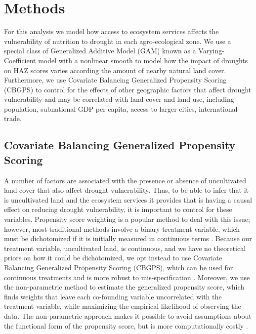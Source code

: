 \documentclass{article}
\begin{document}
\section{Methods}
For this analysis we model how access to ecosystem services affects the vulnerability of nutrition to drought in each agro-ecological zone.  We use a special class of Generalized Additive Model (GAM) known as a Varying-Coefficient model \cite{Wood2017} with a nonlinear smooth to model how the impact of droughts on HAZ scores varies according the amount of nearby natural land cover.  Furthermore, we use Covariate Balancing Generalized Propensity Scoring (CBGPS) to control for the effects of other geographic factors that affect drought vulnerability and may be correlated with land cover and land use, including population, subnational GDP per capita, access to larger cities, international trade.

\subsection{Covariate Balancing Generalized Propensity Scoring}
A number of factors are associated with the presence or absence of uncultivated land cover that also affect drought vulnerability.  Thus, to be able to infer that it is uncultivated land and the ecosystem services it provides that is having a causal effect on reducing drought vulnerability, it is important to control for these variables.  Propensity score weighting is a popular method to deal with this issue; however, most traditional methods involve a binary treatment variable, which must be dichotomized if it is initially measured in continuous terms \cite{Hirano2003, Robins2000}.  Because our treatment variable, uncultivated land, is continuous, and we have no theoretical priors on how it could be dichotomized, we opt instead to use Covariate Balancing Generalized Propensity Scoring (CBGPS), which can be used for continuous treatments and is more robust to mis-specification \cite{Fong2018}.  Moreover, we use the non-parametric method to estimate the generalized propensity score, which finds weights that leave each co-founding variable uncorrelated with the treatment variable, while maximizing the empirical likelihood of observing the data.  The non-parametric approach makes it possible to avoid assumptions about the functional form of the propensity score, but is more computationally costly \cite{Fong2018}.
\end{document}
